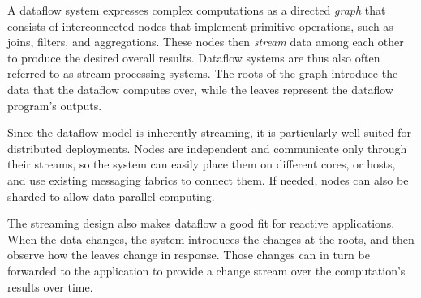 A dataflow system expresses complex computations as a directed \emph{graph} that
consists of interconnected nodes that implement primitive operations, such as
joins, filters, and aggregations. These nodes then \emph{stream} data among each
other to produce the desired overall results. Dataflow systems are thus also
often referred to as stream processing systems. The roots of the graph introduce
the data that the dataflow computes over, while the leaves represent the
dataflow program's outputs.

Since the dataflow model is inherently streaming, it is particularly well-suited
for distributed deployments. Nodes are independent and communicate only through
their streams, so the system can easily place them on different cores, or hosts,
and use existing messaging fabrics to connect them. If needed, nodes can also be
sharded to allow data-parallel computing.

The streaming design also makes dataflow a good fit for reactive applications.
When the data changes, the system introduces the changes at the roots, and then
observe how the leaves change in response. Those changes can in turn be
forwarded to the application to provide a change stream over the computation's
results over time.
